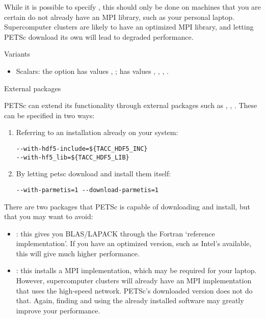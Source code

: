 While it is possible to specify ,
this should only be done on machines that you are certain do not
already have an MPI library, such as your personal
laptop. Supercomputer clusters are likely to have an optimized MPI
library, and letting PETSc download its own will lead to degraded
performance.

 {Variants}

\begin{itemize}
\item Scalars: the option  has values
  , ;  has values
  , , , .
\end{itemize}

 {External packages}
\label{sec:petsc-external}

PETSc can extend its functionality through external packages such as
, , . These can be
specified in two ways:
\begin{enumerate}
\item Referring to an installation already on your system:
\begin{verbatim}
--with-hdf5-include=${TACC_HDF5_INC}
--with-hf5_lib=${TACC_HDF5_LIB}
\end{verbatim}
\item By letting petsc download and install them itself:
\begin{verbatim}
--with-parmetis=1 --download-parmetis=1
\end{verbatim}
\end{enumerate}

\begin{remark}
  There are two packages that PETSc is capable of downloading and install,
  but that you may want to avoid:
  \begin{itemize}
  \item {}: this gives you BLAS/LAPACK through the
    Fortran `reference implementation'. If you have an optimized
    version, such as Intel's  available, this will give
    much higher performance.
  \item {}: this installs a MPI implementation, which may be
    required for your laptop. However, supercomputer clusters will
    already have an MPI implementation that uses the high-speed
    network. PETSc's downloaded version does not do that. Again,
    finding and using the already installed software may greatly
    improve your performance.
  \end{itemize}
\end{remark}
